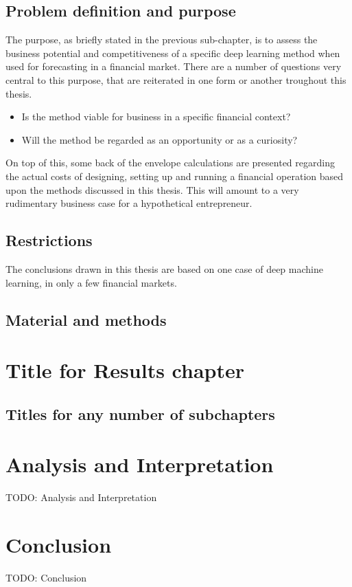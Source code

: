 \subsection{Problem definition and purpose}

The purpose, as briefly stated in the previous sub-chapter, is to assess the business potential and competitiveness of a specific deep learning method when used for forecasting in a financial market. There are a number of questions very central to this purpose, that are reiterated in one form or another troughout this thesis.

\begin{itemize}

\item Is the method viable for business in a specific financial context?

\item Will the method be regarded as an opportunity or as a curiosity?

\end{itemize}

On top of this, some back of the envelope calculations are presented regarding the actual costs of designing, setting up and running a financial operation based upon the methods discussed in this thesis. This will amount to a very rudimentary business case for a hypothetical entrepreneur.




\subsection{Restrictions}

The conclusions drawn in this thesis are based on one case of deep machine learning, in only a few financial markets.


\subsection{Material and methods}

\newpage

\section{Title for Results chapter}
\subsection{Titles for any number of subchapters}

\newpage

\section{Analysis and Interpretation}
TODO: Analysis and Interpretation

\newpage

\section{Conclusion}
TODO: Conclusion
